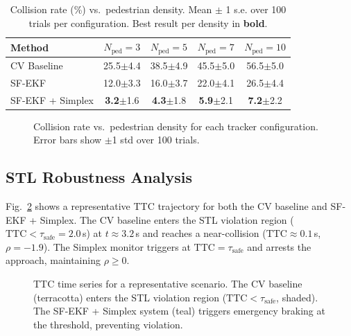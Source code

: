 \documentclass[conference]{IEEEtran}
\begin{document}
\begin{table}[H]
    \centering
    \caption{Collision rate (\%) vs.\ pedestrian density. Mean $\pm$ 1 s.e. over 100 trials per configuration. Best result per density in \textbf{bold}.}
    \label{tab:density_results}
    \renewcommand{\arraystretch}{1.15}
    \begin{tabular}{l c c c c}
        \toprule
        \textbf{Method} & $N_{\text{ped}}{=}3$ & $N_{\text{ped}}{=}5$ & $N_{\text{ped}}{=}7$ & $N_{\text{ped}}{=}10$ \\
        \midrule
        CV Baseline         & 25.5$\pm$4.4 & 38.5$\pm$4.9 & 45.5$\pm$5.0 & 56.5$\pm$5.0 \\
        SF-EKF              & 12.0$\pm$3.3 & 16.0$\pm$3.7 & 22.0$\pm$4.1 & 26.5$\pm$4.4 \\
        SF-EKF + Simplex    & \textbf{3.2}$\pm$1.6 & \textbf{4.3}$\pm$1.8 & \textbf{5.9}$\pm$2.1 & \textbf{7.2}$\pm$2.2 \\
        \bottomrule
    \end{tabular}
\end{table}
\begin{figure}[H]
    \centering
    
    \caption{Collision rate vs.\ pedestrian density for each tracker configuration. Error bars show $\pm$1 std over 100 trials.}
    \label{fig:density_bar}
\end{figure}

\subsection{STL Robustness Analysis}

Fig.~\ref{fig:stl_robustness} shows a representative TTC trajectory for both the CV baseline and SF-EKF + Simplex.
The CV baseline enters the STL violation region ($\mathrm{TTC} < \tau_{\text{safe}} = 2.0$\,s) at $t \approx 3.2$\,s and reaches a near-collision ($\mathrm{TTC} \approx 0.1$\,s, $\rho = -1.9$).
The Simplex monitor triggers at $\mathrm{TTC} = \tau_{\text{safe}}$ and arrests the approach, maintaining $\rho \geq 0$.

\begin{figure}[H]
    \centering
    
    \caption{TTC time series for a representative scenario. The CV baseline (terracotta) enters the STL violation region ($\mathrm{TTC} < \tau_{\text{safe}}$, shaded). The SF-EKF + Simplex system (teal) triggers emergency braking at the threshold, preventing violation.}
    \label{fig:stl_robustness}
\end{figure}
\end{document}
